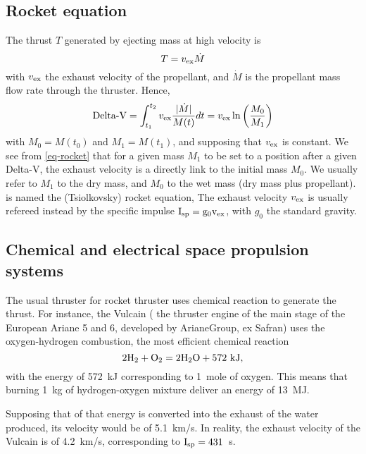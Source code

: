 \subsection*{Rocket equation}
The thrust $T$ generated by ejecting mass at high velocity is
\begin{equation} \label{eq-thurst}
  T = v_{\rm ex} \dot{M}
\end{equation}
with $v_{\rm ex}$ the exhaust velocity of the propellant, and $\dot{M}$ is the propellant mass flow rate through the thruster.
Hence,
\begin{equation} \label{eq-rocket}
  \text{Delta-V} = \int_{t_1}^{t_2} v_{\rm ex} \frac{ \lvert\dot{M}\rvert}{M(t)} dt = v_{\rm ex} \ln \left( \frac{M_0}{M_1} \right)
\end{equation}
with $M_0 = M(t_0)$ and $M_1=M(t_1)$, and supposing that $v_{\rm ex}$ is constant.
We see from \cref{eq-rocket} that for a given mass $M_1$ to be set to a position after a given Delta-V, the exhaust velocity is a directly link to the initial mass $M_0$.
We usually refer to $M_1$ to the dry mass, and $M_0$ to the wet mass (dry mass plus propellant).
 is named the (Tsiolkovsky) rocket equation, 
The exhaust velocity $v_{\rm ex}$ is usually refereed instead by the specific impulse $\rm I_{\rm sp} = g_0 v_{\rm ex}$, with $g_0$ the standard gravity.

\subsection*{Chemical and electrical space propulsion systems}
The usual thruster for rocket thruster uses chemical reaction to generate the thrust.
For instance, the Vulcain ( the thruster engine of the main stage of the European Ariane 5 and 6, developed by ArianeGroup, ex Safran) uses the oxygen-hydrogen combustion, the most efficient chemical reaction \citep{nasa-H2O2}
\begin{equation*}
  2 {\rm H_2} + { \rm O_2} = 2 {\rm H_2 O} + 572 \text{~kJ},
\end{equation*}
with the energy of 572~kJ corresponding to 1~mole of oxygen.
This means that burning 1~kg of hydrogen-oxygen mixture deliver an energy of 13~MJ. 

Supposing that of that energy is converted into the exhaust of the water produced, its velocity would be of 5.1~km/s.
In reality, the exhaust velocity of the Vulcain is of 4.2~km/s, corresponding to $\rm I_{\rm sp}=431$~s.

